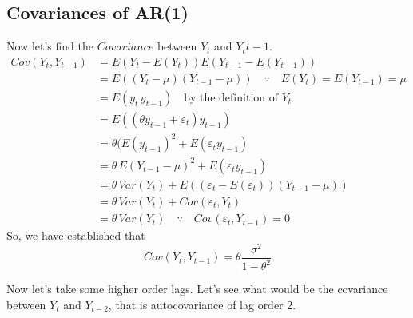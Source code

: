 \documentclass{book}
\begin{document}
\subsection{Covariances of AR(1)}	
	Now let's find the $Covariance$ between $Y_t$ and $Y_t{t-1}$.
	\begin{equation}
		\begin{split}
		Cov(Y_t,Y_{t-1}) & =E(Y_t-E(Y_t))E(Y_{t-1}-E(Y_{t-1}))\\
		& =E((Y_t-\mu)(Y_{t-1}-\mu))\quad \because \quad E(Y_t)=E(Y_{t-1})=\mu\\
		& =E(y_t\, y_{t-1})\quad \text{by the definition of $Y_t$}\\
		& =E((\theta y_{t-1}+\varepsilon_t)y_{t-1})\\
		& =\theta (E(y_{t-1})^2+E(\varepsilon_t y_{t-1})\\
		& =\theta \, E(Y_{t-1}-\mu)^2+E(\varepsilon_t y_{t-1})\\
		& =\theta \, Var(Y_t)+E((\varepsilon_t-E(\varepsilon_t)) (Y_{t-1}-\mu))\\
		& =\theta \, Var(Y_t)+Cov(\varepsilon_t,Y_t)\\
		& =\theta \, Var(Y_t)\quad \because \quad Cov(\varepsilon_t,Y_{t-1})=0
		\end{split}
		\label{eqcov}
	\end{equation}
So, we have established that 
\begin{equation}
	Cov(Y_t,Y_{t-1})=\theta \frac{\sigma^2}{1-\theta^2}
	\label{eqcov2}
\end{equation}

Now let's take some higher order lags. Let's see what would be the covariance between $Y_t$ and $Y_{t-2}$, that is autocovariance of lag order 2.  
\end{document}
